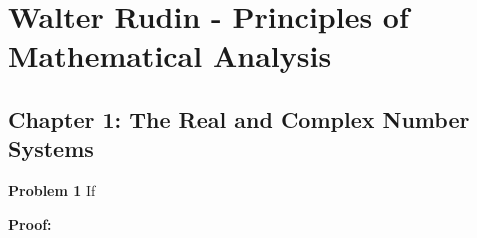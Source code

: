 \documentclass{article}
\begin{document}
\section*{Walter Rudin - Principles of Mathematical Analysis}
\subsection*{Chapter 1: The Real and Complex Number Systems}

\textbf{Problem 1}
If 

\textbf{Proof:}
\end{document}

